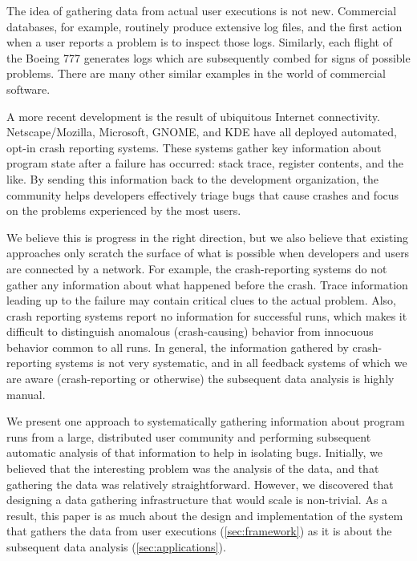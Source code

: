 The idea of gathering data from actual user executions is not new.
Commercial databases, for example, routinely produce extensive log
files, and the first action when a user reports a problem is to
inspect those logs.  Similarly, each flight of the Boeing 777
generates logs which are subsequently combed for signs of possible
problems.  There are many other similar examples in
the world of commercial software.

A more recent development is the result of ubiquitous Internet
connectivity.  Netscape/Mozilla, Microsoft, GNOME, and KDE have all
deployed automated, opt-in crash reporting systems.  These systems
gather key information about program state after a failure has
occurred: stack trace, register contents, and the like.  By sending
this information back to the development organization, the community
helps developers effectively triage bugs that cause crashes and focus
on the problems experienced by the most users.

We believe this is progress in the right direction, but we also
believe that existing approaches only scratch the surface of what is
possible when developers and users are connected by a network.  For
example, the crash-reporting systems do not gather any information
about what happened before the crash.  Trace information leading up to
the failure may contain critical clues to the actual problem.  Also,
crash reporting systems report no information for successful runs,
which makes it difficult to distinguish anomalous (crash-causing)
behavior from innocuous behavior common to all runs.  In general, the
information gathered by crash-reporting systems is not very
systematic, and in all feedback systems of which we are aware
(crash-reporting or otherwise) the subsequent data analysis is highly
manual.

We present one approach to systematically gathering information about
program runs from a large, distributed user community and performing
subsequent automatic analysis of that information to help in isolating
bugs.  Initially, we believed that the interesting problem was the
analysis of the data, and that gathering the data was relatively
straightforward.  However, we discovered that designing a data
gathering infrastructure that would scale is non-trivial.  As a
result, this paper is as much about the design and implementation of
the system that gathers the data from user executions
(\autoref{sec:framework}) as it is about the subsequent data analysis
(\autoref{sec:applications}).

